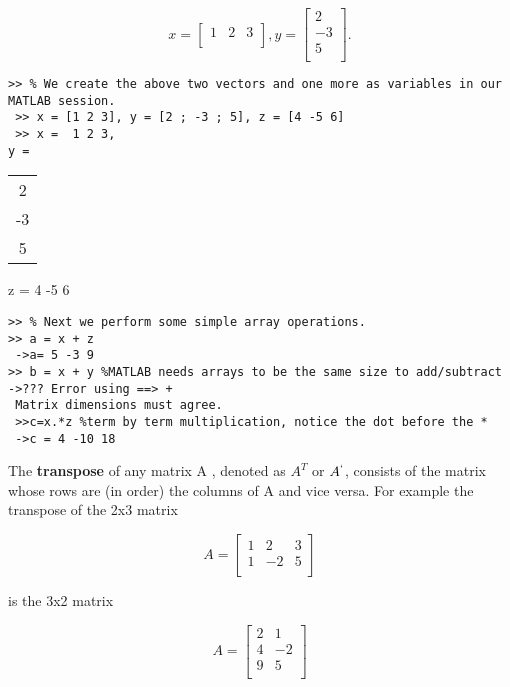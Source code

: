 \documentclass[../main.tex]{subfiles}
\begin{document}
\begin{equation*}
	x =
	\begin{bmatrix}
	1&2&3\\
	\end{bmatrix},
	y=
	\begin{bmatrix}
	2\\
	-3\\
	5\\
	\end{bmatrix}.
\end{equation*}

\begin{verbatim}
>> % We create the above two vectors and one more as variables in our MATLAB session.
 >> x = [1 2 3], y = [2 ; -3 ; 5], z = [4 -5 6]
 >> x =  1 2 3,
y =
\end{verbatim}
\begin{tabular}{c}
2\\
-3\\
5\\
\end{tabular}
\hspace{1cm}z = 4 -5 6
\\

\begin{verbatim}
>> % Next we perform some simple array operations.
>> a = x + z 
 ->a= 5 -3 9 
>> b = x + y %MATLAB needs arrays to be the same size to add/subtract
->??? Error using ==> +
 Matrix dimensions must agree. 
 >>c=x.*z %term by term multiplication, notice the dot before the * 
 ->c = 4 -10 18  
\end{verbatim}
 
 The \textbf{transpose} of any matrix A , denoted as $A^T$ or $A^`$, consists of the matrix whose rows are (in order) the columns of A and vice versa. For example the transpose of the 2x3 matrix

 \begin{equation*}
	A =
	\begin{bmatrix}
	1&2&3\\
	1&-2&5\\
	\end{bmatrix}
\end{equation*}

\noindent is the 3x2 matrix 

 \begin{equation*}
	A =
	\begin{bmatrix}
	2&1\\
	4&-2\\
	9&5\\
	\end{bmatrix}
\end{equation*}
\end{document}
